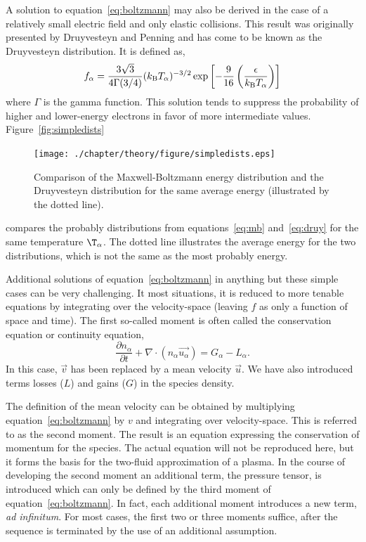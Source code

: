 A solution to equation~\ref{eq:boltzmann} may also be derived in the case of a
relatively small electric field and only elastic collisions. This result was
originally presented by Druyvesteyn and Penning \cite{Druyvesteyn1940} and has
come to be known as the Druyvesteyn distribution. It is defined as,
\begin{equation}
  f_{\alpha} = \frac{3\sqrt{3}}{4\Gamma(3/4)}(k_\mathrm{B} T_\alpha)^{-3/2}
  \exp{\left[-\frac{9}{16}\left(\frac{\epsilon}{k_\mathrm{B}T_\alpha}\right)\right]}
  \label{eq:druy}
\end{equation}
where $\Gamma$ is the gamma function. This solution tends to suppress the
probability of higher and lower-energy electrons in favor of more intermediate
values. Figure~\ref{fig:simpledists}
\begin{figure}
  \centering
  \texttt{[image: ./chapter/theory/figure/simpledists.eps]}
  \caption{Comparison of the Maxwell-Boltzmann energy distribution and the
    Druyvesteyn distribution for the same average energy (illustrated by the
  dotted line).}
\end{figure}
compares the probably distributions from equations~\ref{eq:mb}
and~\ref{eq:druy} for the same temperature $\T_\alpha$. The dotted line
illustrates the average energy for the two distributions, which is not the same
as the most probably energy.

Additional solutions of equation~\ref{eq:boltzmann} in anything but these simple
cases can be very challenging. It most situations, it is reduced to more tenable
equations by integrating over the velocity-space (leaving $f$ as only a function
of space and time). The first so-called moment is often called the conservation
equation or continuity equation,
\begin{equation}\label{eq:cont}
  \frac{\partial n_\alpha}{\partial t} + \nabla \cdot (n_\alpha \vec{u_\alpha})
  = G_\alpha - L_\alpha.
\end{equation}
In this case, $\vec{v}$ has been replaced by a mean velocity $\vec{u}$. We have
also introduced terms losses ($L$) and gains ($G$) in the species density.

The definition of the mean velocity can be obtained by multiplying
equation~\ref{eq:boltzmann} by $v$ and integrating over velocity-space. This is
referred to as the second moment. The result is an equation expressing the
conservation of momentum for the species. The actual equation will not be
reproduced here, but it forms the basis for the two-fluid approximation of a
plasma. In the course of developing the second moment an additional term, the
pressure tensor, is introduced which can only be defined by the third moment of
equation~\ref{eq:boltzmann}. In fact, each additional moment introduces a new
term, \emph{ad infinitum}. For most cases, the first two or three moments
suffice, after the sequence is terminated by the use of an additional
assumption.

